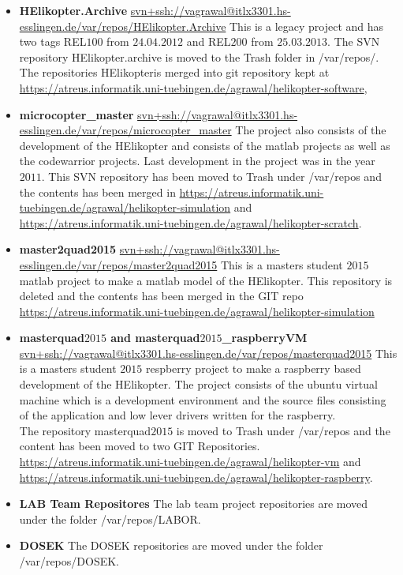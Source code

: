\begin{itemize}
  \item
  \textbf{HElikopter.Archive}
  \url{svn+ssh://vagrawal@itlx3301.hs-esslingen.de/var/repos/HElikopter.Archive} This is a legacy project and has two tags REL$100$ from
  $24.04.2012$ and REL$200$ from $25.03.2013$.
  The SVN repository HElikopter.archive is moved to the
  Trash folder in /var/repos/. 
  The repositories HElikopteris merged into git repository kept at
  \url{https://atreus.informatik.uni-tuebingen.de/agrawal/helikopter-software},
  \item
  \textbf{microcopter\_master}
  \url{svn+ssh://vagrawal@itlx3301.hs-esslingen.de/var/repos/microcopter_master}
  The project also consists of the development of the HElikopter and consists of
  the matlab projects as well as the codewarrior projects. Last development in
  the project was in the year $2011$. This SVN repository has been moved to
  Trash under /var/repos and the contents has been merged in 
  \url{https://atreus.informatik.uni-tuebingen.de/agrawal/helikopter-simulation}
  and
  \url{https://atreus.informatik.uni-tuebingen.de/agrawal/helikopter-scratch}.
  \item
  \textbf{master2quad2015}
  \url{svn+ssh://vagrawal@itlx3301.hs-esslingen.de/var/repos/master2quad2015}
  This is a masters student $2015$ matlab project to make a matlab model of
  the HElikopter. This repository is deleted and the contents has been merged
  in the GIT repo \url{https://atreus.informatik.uni-tuebingen.de/agrawal/helikopter-simulation}
  \item
  \textbf{masterquad$2015$ and masterquad$2015$\_raspberryVM}
  \url{svn+ssh://vagrawal@itlx3301.hs-esslingen.de/var/repos/masterquad2015}
  This is a masters student $2015$ respberry project to make a raspberry based
  development of the HElikopter. The project consists of the ubuntu virtual
  machine which is a development environment and the source files consisting of
  the application and low lever drivers written for the raspberry.\\
  The repository masterquad$2015$ is moved to Trash under /var/repos and the
  content has been moved to two GIT Repositories.
  \url{https://atreus.informatik.uni-tuebingen.de/agrawal/helikopter-vm}
  and
  \url{https://atreus.informatik.uni-tuebingen.de/agrawal/helikopter-raspberry}.
  \item
  \textbf{LAB Team Repositores}
  The lab team project repositories are moved under the folder /var/repos/LABOR.
  \item
  \textbf{DOSEK}
  The DOSEK repositories are moved under the folder /var/repos/DOSEK.
  \end{itemize}
  
